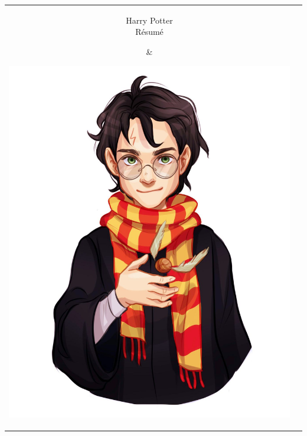 \documentclass[10pt]{article} %
\begin{document}
\begin{paracol}{2} %

\begin{tabular}{cc}
\parbox[top][0.12\textheight][c]{0.6\linewidth}{
	\vspace{-0.04\textheight} %
	\centering %
	{\sffamily\Huge Harry Potter}\\\medskip %
	{\Huge\color{headings}\cvtextfont Résumé}
}
 &
\parbox[top][0.12\textheight][c]{0.4\linewidth}{
	\vspace{-0.04\textheight} %
	\includegraphics[width=0.8\linewidth]{photo2.jpg} %

} \\
\end{tabular}





\end{paracol}
\end{document}
